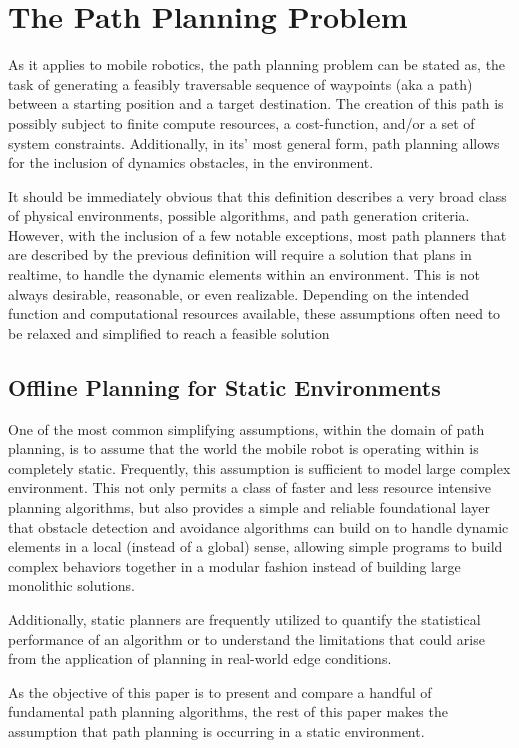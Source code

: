 \section{The Path Planning Problem} 

As it applies to mobile robotics, the path planning problem can be stated as, the task of generating a feasibly traversable sequence of waypoints (aka a path) between a starting position and a target destination. The creation of this path is possibly subject to finite compute resources, a cost-function, and/or a set of system constraints. Additionally, in its' most general form, path planning allows for the inclusion of dynamics obstacles, in the environment. 

It should be immediately obvious that this definition describes a very broad class of physical environments, possible algorithms, and path generation criteria. However, with the inclusion of a few notable exceptions, most path planners that are described by the previous definition will require a solution that plans in realtime, to handle the dynamic elements within an environment. This is not always desirable, reasonable, or even realizable. Depending on the intended function and computational resources available, these assumptions often need to be relaxed and simplified to reach a feasible solution

\subsection{Offline Planning for Static Environments}

One of the most common simplifying assumptions, within the domain of path planning, is to assume that the world the mobile robot is operating within is completely static. Frequently, this assumption is sufficient to model large complex environment. This not only permits a class of faster and less resource intensive planning algorithms, but also provides a simple and reliable foundational layer that obstacle detection and avoidance algorithms can build on to handle dynamic elements in a local (instead of a global) sense, allowing simple programs to build complex behaviors together in a modular fashion instead of building large monolithic solutions. 

Additionally, static planners are frequently utilized to quantify the statistical performance of an algorithm or to understand the limitations that could arise from the application of planning in real-world edge conditions. 

As the objective of this paper is to present and compare a handful of fundamental path planning algorithms, the rest of this paper makes the assumption that path planning is occurring in a static environment.